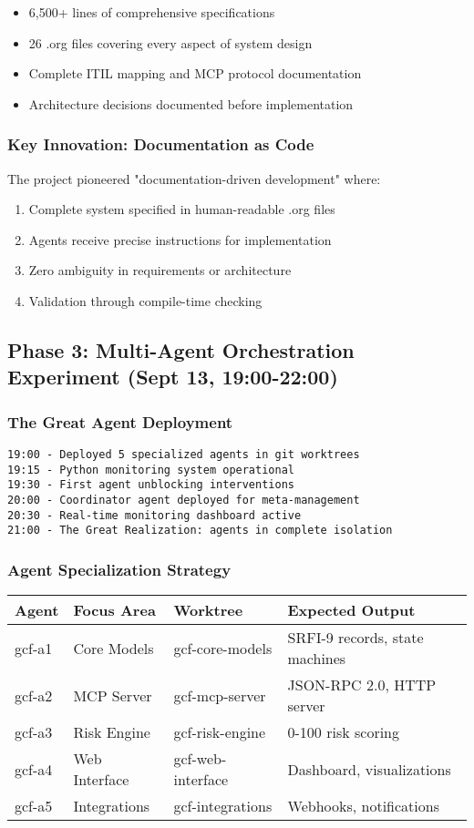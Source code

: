 \documentclass[11pt]{article}
\begin{document}
\begin{itemize}
\item 6,500+ lines of comprehensive specifications
\item 26 .org files covering every aspect of system design
\item Complete ITIL mapping and MCP protocol documentation
\item Architecture decisions documented before implementation
\end{itemize}
\subsubsection{Key Innovation: Documentation as Code}
\label{sec:orgd6a2a89}
The project pioneered "documentation-driven development" where:
\begin{enumerate}
\item Complete system specified in human-readable .org files
\item Agents receive precise instructions for implementation
\item Zero ambiguity in requirements or architecture
\item Validation through compile-time checking
\end{enumerate}
\subsection{Phase 3: Multi-Agent Orchestration Experiment (Sept 13, 19:00-22:00)}
\label{sec:org467cc1e}
\subsubsection{The Great Agent Deployment}
\label{sec:org0a54800}
\begin{verbatim}
19:00 - Deployed 5 specialized agents in git worktrees
19:15 - Python monitoring system operational
19:30 - First agent unblocking interventions
20:00 - Coordinator agent deployed for meta-management
20:30 - Real-time monitoring dashboard active
21:00 - The Great Realization: agents in complete isolation
\end{verbatim}
\subsubsection{Agent Specialization Strategy}
\label{sec:org3a9adaa}
\begin{center}
\begin{tabular}{llll}
Agent & Focus Area & Worktree & Expected Output\\
\hline
gcf-a1 & Core Models & gcf-core-models & SRFI-9 records, state machines\\
gcf-a2 & MCP Server & gcf-mcp-server & JSON-RPC 2.0, HTTP server\\
gcf-a3 & Risk Engine & gcf-risk-engine & 0-100 risk scoring\\
gcf-a4 & Web Interface & gcf-web-interface & Dashboard, visualizations\\
gcf-a5 & Integrations & gcf-integrations & Webhooks, notifications\\
\end{tabular}
\end{center}
\end{document}
